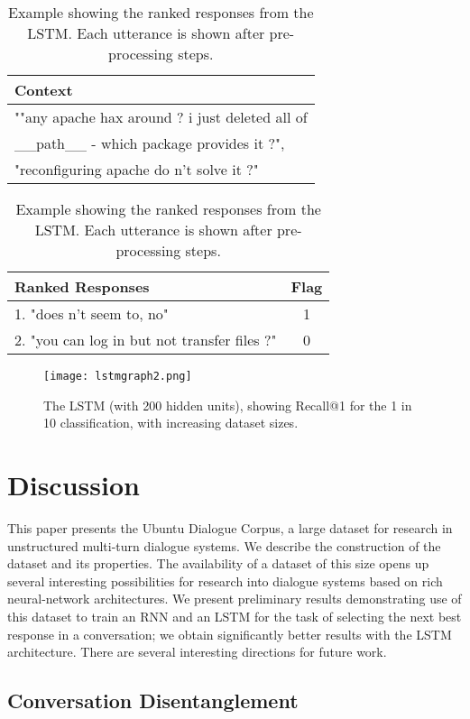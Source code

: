 \documentclass[11pt,a4paper]{article}
\begin{document}
\begin{table}[!ht]
\small
\begin{tabular}{|l|} \hline
Context \\ \hline
""any apache hax around ? i just deleted all of \\
\_\_path\_\_ - which package provides it ?", \\ 
"reconfiguring apache do n't solve it ?" \\ \hline \hline
\end{tabular}
\begin{tabular}{|l |c|} \hline 
Ranked Responses & Flag \\ \hline
1. "does n't seem to, no" & 1  \\ \hline
2. "you can log in but not transfer files ?"  & 0  \\ \hline 
\end{tabular}
\caption{\label{example}Example showing the ranked responses from the LSTM. Each utterance is shown after pre-processing steps.}
\end{table} 


\begin{figure}
\centering
\texttt{[image: lstmgraph2.png]}
\caption{\label{datasize} The LSTM (with 200 hidden units), showing Recall@1 for the 1 in 10 classification, with increasing dataset sizes.}
\end{figure}



\section{Discussion}
\label{sec:discussion}

This paper presents the Ubuntu Dialogue Corpus, a large dataset for research in unstructured multi-turn dialogue systems.  We describe the construction of the dataset and its properties.   The availability of a dataset of this size opens up several interesting possibilities for research into dialogue systems based on rich neural-network architectures.  We present preliminary results demonstrating use of this dataset to train an RNN and an LSTM  for the task of selecting the next best response in a conversation; we obtain significantly better results with the LSTM architecture. There are several interesting directions for future work.

\subsection{Conversation Disentanglement}
\end{document}
